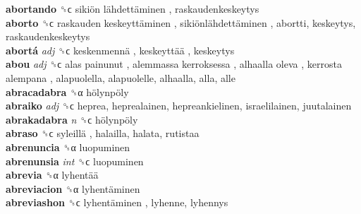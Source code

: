 \textbf{abortando} ␝ϲ   sikiön lähdettäminen , raskaudenkeskeytys  \\
\textbf{aborto} ␝ϲ   raskauden keskeyttäminen ,  sikiönlähdettäminen , abortti, keskeytys, raskaudenkeskeytys  \\
\textbf{abortá} \emph{adj}  ␝ϲ   keskenmennä ,  keskeyttää , keskeytys  \\
\textbf{abou} \emph{adj}  ␝ϲ   alas painunut ,  alemmassa kerroksessa ,  alhaalla oleva ,  kerrosta alempana , alapuolella, alapuolelle, alhaalla, alla, alle  \\
\textbf{abracadabra} ␝α   hölynpöly   \\
\textbf{abraiko} \emph{adj}  ␝ϲ  heprea, heprealainen, hepreankielinen, israelilainen, juutalainen  \\
\textbf{abrakadabra} \emph{n}  ␝ϲ   hölynpöly   \\
\textbf{abraso} ␝ϲ   syleillä , halailla, halata, rutistaa  \\
\textbf{abrenuncia} ␝α  luopuminen  \\
\textbf{abrenunsia} \emph{int}  ␝ϲ  luopuminen  \\
\textbf{abrevia} ␝α   lyhentää   \\
\textbf{abreviacion} ␝α   lyhentäminen   \\
\textbf{abreviashon} ␝ϲ   lyhentäminen , lyhenne, lyhennys  \\
